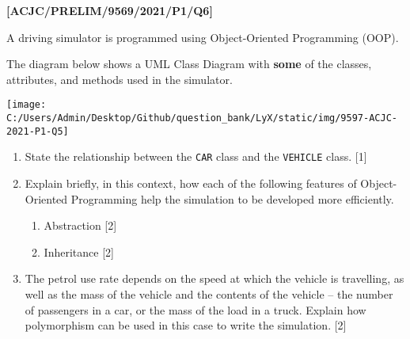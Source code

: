 \item \textbf{{[}ACJC/PRELIM/9569/2021/P1/Q6{]} }

A driving simulator is programmed using Object-Oriented Programming
(OOP).

The diagram below shows a UML Class Diagram with \textbf{some} of
the classes, attributes, and methods used in the simulator.
\noindent \begin{center}
\texttt{[image: C:/Users/Admin/Desktop/Github/question\_bank/LyX/static/img/9597-ACJC-2021-P1-Q5]}\quad{}
\par\end{center}
\begin{enumerate}
\item State the relationship between the \texttt{CAR} class and the \texttt{VEHICLE}
class. \hfill{}{[}1{]}
\item Explain briefly, in this context, how each of the following features
of Object-Oriented Programming help the simulation to be developed
more efficiently.
\begin{enumerate}
\item Abstraction \hfill{} {[}2{]}
\item Inheritance \hfill{}{[}2{]}
\end{enumerate}
\item The petrol use rate depends on the speed at which the vehicle is travelling,
as well as the mass of the vehicle and the contents of the vehicle
-- the number of passengers in a car, or the mass of the load in
a truck. Explain how polymorphism can be used in this case to write
the simulation. \hfill{}{[}2{]}
\end{enumerate}